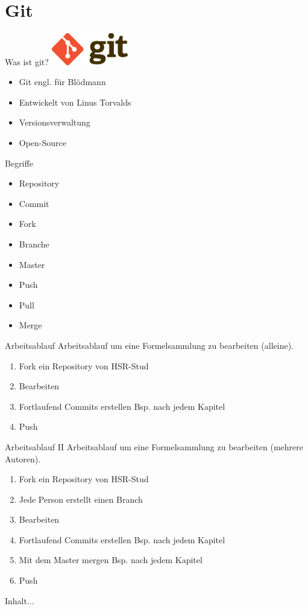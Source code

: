 \section{Git}
\begin{frame}{Was ist git?}
	\includegraphics[width=0.25\textwidth]{pic/git.eps}\\
	\begin{itemize}
		\item Git engl. für Blödmann
		\item Entwickelt von Linus Torvalds
		\item Versionsverwaltung
		\item Open-Source
	\end{itemize}
\end{frame}

\begin{frame}{Begriffe}
	\begin{itemize}
		\item Repository
		\item Commit
		\item Fork
		\item Branche
		\item Master
		\item Push
		\item Pull
		\item Merge		
	\end{itemize}	
\end{frame}

\begin{frame}{Arbeitsablauf}
	Arbeitsablauf um eine Formelsammlung zu bearbeiten (alleine).
	\begin{enumerate}
		\item Fork ein Repository von HSR-Stud
		\item Bearbeiten
		\item Fortlaufend Commits erstellen Bsp. nach jedem Kapitel
		\item Push
	\end{enumerate}
	
\end{frame}

\begin{frame}{Arbeitsablauf II}
Arbeitsablauf um eine Formelsammlung zu bearbeiten (mehrere Autoren).
\begin{enumerate}
	\item Fork ein Repository von HSR-Stud
	\item Jede Person erstellt einen Branch
	\item Bearbeiten
	\item Fortlaufend Commits erstellen Bsp. nach jedem Kapitel
	\item Mit dem Master mergen Bsp. nach jedem Kapitel
	\item Push
\end{enumerate}

\end{frame}

\begin{frame}
Inhalt...
\end{frame}